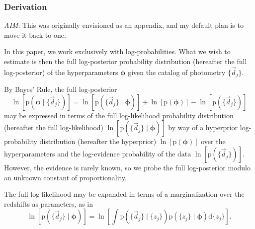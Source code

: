 \documentclass[iop]{emulateapj}
\newcommand{\todo}[3]{{\color{#2}\emph{#1}: #3}}
\newcommand{\aim}[1]{\todo{AIM}{red}{#1}}
\newcommand{\data}{\ensuremath{\vec{d}}}
\newcommand{\pr}[1]{\ensuremath{\mathrm{p}(#1)}}
\newcommand{\gvn}{\mid}%
\newcommand{\integral}[2]{\ensuremath{\int #1 \mathrm{d} #2}}
\newcommand{\bvec}[1]{\ensuremath{\boldsymbol{#1}}}
\newcommand{\ndphi}{\bvec{\phi}}
\begin{document}
\subsubsection{Derivation}
\label{app:math}

\aim{This was originally envisioned as an appendix, and my default plan is to move it back to one.}


In this paper, we work exclusively with log-probabilities.  
What we wish to estimate is then the full log-posterior probability distribution (hereafter the full log-posterior) of the hyperparameters $\ndphi$ given the catalog of photometry $\{\data_{j}\}$.

By Bayes' Rule, the full log-posterior
\begin{equation}
\label{eqn:basicbayes}
\ln[\pr{\ndphi \gvn \{\data_{j}\}}] = \ln[\pr{\{\data_{j}\} \gvn \ndphi}] + \ln[\pr{\ndphi}] - \ln[\pr{\{\data_{j}\}}]
\end{equation}
may be expressed in terms of the full log-likelihood probability distribution (hereafter the full log-likelihood) $\ln[\pr{\{\data_{j}\} \gvn \ndphi}]$ by way of a hyperprior log-probability distribution (hereafter the hyperprior) $\ln[\pr{\ndphi}]$ over the hyperparameters and the log-evidence probability of the data $\ln[\pr{\{\data_{j}\}}]$.
However, the evidence is rarely known, so we probe the full log-posterior modulo an unknown constant of proportionality.

The full log-likelihood may be expanded in terms of a marginalization over the redshifts as parameters, as in 
\begin{equation}
\label{eqn:marginalize}
\ln[\pr{\{\data_{j}\} \gvn \ndphi}] = \ln\left[\integral{\pr{\{\data_{j}\} \gvn \{z_{j}\}} \pr{\{z_{j}\} \gvn \ndphi}}{\{z_{j}\}}\right].
\end{equation}
\end{document}
